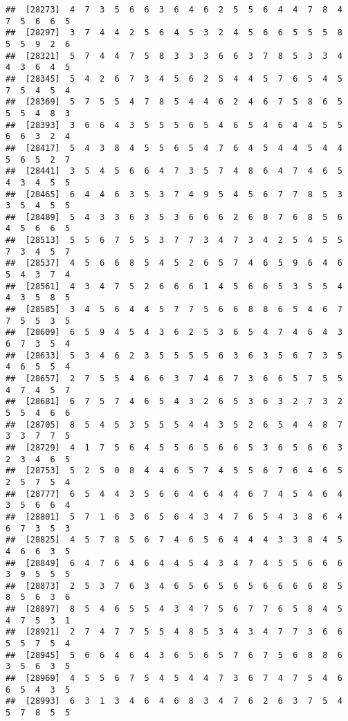 \documentclass[
]{book}
\begin{document}
\begin{verbatim}
##  [28273]  4  7  3  5  6  6  3  6  4  6  2  5  5  6  4  4  7  8  4  7  5  6  6  5
##  [28297]  3  7  4  4  2  5  6  4  5  3  2  4  5  6  6  5  5  5  8  5  5  9  2  6
##  [28321]  5  7  4  4  7  5  8  3  3  3  6  6  3  7  8  5  3  3  4  4  3  6  4  5
##  [28345]  5  4  2  6  7  3  4  5  6  2  5  4  4  5  7  6  5  4  5  7  5  4  5  4
##  [28369]  5  7  5  5  4  7  8  5  4  4  6  2  4  6  7  5  8  6  5  5  5  4  8  3
##  [28393]  3  6  6  4  3  5  5  5  6  5  4  6  5  4  6  4  4  5  5  6  6  3  2  4
##  [28417]  5  4  3  8  4  5  5  6  5  4  7  6  4  5  4  4  5  4  4  5  6  5  2  7
##  [28441]  3  5  4  5  6  6  4  7  3  5  7  4  8  6  4  7  4  6  5  4  3  4  5  5
##  [28465]  6  4  4  6  3  5  3  7  4  9  5  4  5  6  7  7  8  5  3  3  5  4  5  5
##  [28489]  5  4  3  3  6  3  5  3  6  6  6  2  6  8  7  6  8  5  6  4  5  6  6  5
##  [28513]  5  5  6  7  5  5  3  7  7  3  4  7  3  4  2  5  4  5  5  7  3  4  5  7
##  [28537]  4  5  6  6  8  5  4  5  2  6  5  7  4  6  5  9  6  4  6  5  4  3  7  4
##  [28561]  4  3  4  7  5  2  6  6  6  1  4  5  6  6  5  3  5  5  4  4  3  5  8  5
##  [28585]  3  4  5  6  4  4  5  7  7  5  6  6  8  8  6  5  4  6  7  7  5  5  3  5
##  [28609]  6  5  9  4  5  4  3  6  2  5  3  6  5  4  7  4  6  4  3  6  7  3  5  4
##  [28633]  5  3  4  6  2  3  5  5  5  5  6  3  6  3  5  6  7  3  5  4  6  5  5  4
##  [28657]  2  7  5  5  4  6  6  3  7  4  6  7  3  6  6  5  7  5  5  4  7  4  5  7
##  [28681]  6  7  5  7  4  6  5  4  3  2  6  5  3  6  3  2  7  3  2  5  5  4  6  6
##  [28705]  8  5  4  5  3  5  5  5  4  4  3  5  2  6  5  4  4  8  7  3  3  7  7  5
##  [28729]  4  1  7  5  6  4  5  5  6  5  6  6  5  3  6  5  6  6  3  2  3  4  6  5
##  [28753]  5  2  5  0  8  4  4  6  5  7  4  5  5  6  7  6  4  6  5  2  5  7  5  4
##  [28777]  6  5  4  4  3  5  6  6  4  6  4  4  6  7  4  5  4  6  4  3  5  6  6  4
##  [28801]  5  7  1  6  3  6  5  6  4  3  4  7  6  5  4  3  8  6  4  6  7  3  5  3
##  [28825]  4  5  7  8  5  6  7  4  6  5  6  4  4  4  3  3  8  4  5  4  6  6  3  5
##  [28849]  6  4  7  6  4  6  4  4  5  4  3  4  7  4  5  5  6  6  6  3  9  5  5  5
##  [28873]  2  5  3  7  6  3  4  6  5  6  5  6  5  6  6  6  6  8  5  8  5  6  3  6
##  [28897]  8  5  4  6  5  5  4  3  4  7  5  6  7  7  6  5  8  4  5  4  7  5  3  1
##  [28921]  2  7  4  7  7  5  5  4  8  5  3  4  3  4  7  7  3  6  6  5  5  7  5  4
##  [28945]  5  6  6  4  6  4  3  6  5  6  5  7  6  7  5  6  8  8  6  3  5  6  3  5
##  [28969]  4  5  5  6  7  5  4  5  4  4  7  3  6  7  4  7  5  4  6  6  5  4  3  5
##  [28993]  6  3  1  3  4  6  4  6  8  3  4  7  6  2  6  3  7  5  4  5  7  8  5  5

\end{verbatim}
\end{document}
